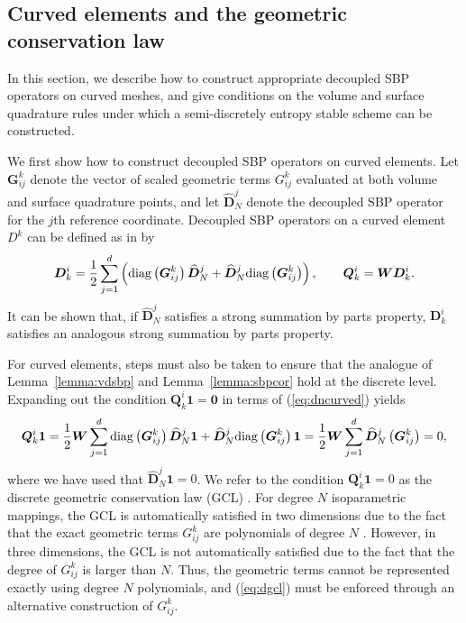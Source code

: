 \documentclass{svjour3}                     %
\renewcommand{\hat}{\widehat}
\newcommand{\diag}[1]{{\rm diag}\LRp{#1}}
\newcommand{\LRp}[1]{\left( #1 \right)}
\begin{document}
\subsection{Curved elements and the geometric conservation law}
\label{sec:curved}

In this section, we describe how to construct appropriate decoupled SBP operators on curved meshes, and give conditions on the volume and surface quadrature rules under which a semi-discretely entropy stable scheme can be constructed.


We first show how to construct decoupled SBP operators on curved elements.  Let $\bm{G}^k_{ij}$ denote the vector of scaled geometric terms ${G}^k_{ij}$ evaluated at both volume and surface quadrature points, and let $\hat{\bm{D}}^j_N$ denote the decoupled SBP operator for the $j$th reference coordinate.  Decoupled SBP operators on a curved element $D^k$ can be defined as in \cite{chan2018discretely} by
\begin{equation}
\bm{D}^i_k = \frac{1}{2}\sum_{j=1}^d \LRp{\diag{\bm{G}^k_{ij}}\hat{\bm{D}}^j_N + \hat{\bm{D}}^j_N\diag{\bm{G}^k_{ij}}}, \qquad \bm{Q}^i_k = \bm{W} \bm{D}^i_k.
\label{eq:dncurved}
\end{equation}
It can be shown that, if $\hat{\bm{D}}^j_N$ satisfies a strong summation by parts property, $\bm{D}^i_k$ satisfies an analogous strong summation by parts property.

For curved elements, steps must also be taken to ensure that the analogue of Lemma~\ref{lemma:vdsbp} and Lemma~\ref{lemma:sbpcor} hold at the discrete level.  Expanding out the condition $\bm{Q}^i_k\bm{1} = \bm{0}$ in terms of (\ref{eq:dncurved}) yields
\begin{align}
\bm{Q}^i_k \bm{1} = \frac{1}{2} \bm{W}\sum_{j=1}^d \diag{\bm{G}^k_{ij}}\hat{\bm{D}}^j_N \bm{1} + \hat{\bm{D}}^j_N\diag{\bm{G}^k_{ij}}\bm{1} = \frac{1}{2}\bm{W}\sum_{j=1}^d \hat{\bm{D}}^j_N\LRp{\bm{G}^k_{ij}} = 0,
\label{eq:dgcl}
\end{align}
where we have used that $\hat{\bm{D}}^j_N \bm{1} = 0$.  We refer to the condition $\bm{Q}^i_k\bm{1} = 0$ as the discrete geometric conservation law (GCL) \cite{thomas1979geometric, kopriva2006metric}.  For degree $N$ isoparametric mappings, the GCL is automatically satisfied in two dimensions due to the fact that the exact geometric terms ${G}^k_{ij}$ are polynomials of degree $N$ \cite{kopriva2006metric}.  However, in three dimensions, the GCL is not automatically satisfied due to the fact that the degree of $G^k_{ij}$ is larger than $N$.  Thus, the geometric terms cannot be represented exactly using degree $N$ polynomials, and (\ref{eq:dgcl}) must be enforced through an alternative construction of ${G}^k_{ij}$.  
\end{document}

